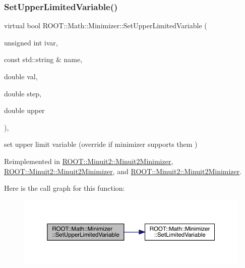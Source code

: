 \subsubsection{\texorpdfstring{SetUpperLimitedVariable()}{SetUpperLimitedVariable()}\hspace{0.1cm}{\footnotesize\ttfamily [2/3]}}
{\footnotesize\ttfamily virtual bool R\+O\+O\+T\+::\+Math\+::\+Minimizer\+::\+Set\+Upper\+Limited\+Variable (\begin{DoxyParamCaption}\item[{unsigned int}]{ivar,  }\item[{const std\+::string \&}]{name,  }\item[{double}]{val,  }\item[{double}]{step,  }\item[{double}]{upper }\end{DoxyParamCaption})\hspace{0.3cm}{\ttfamily [inline]}, {\ttfamily [virtual]}}



set upper limit variable (override if minimizer supports them ) 



Reimplemented in \mbox{\hyperlink{classROOT_1_1Minuit2_1_1Minuit2Minimizer_a70209b37c419af5d8d1475ce8de29b43}{R\+O\+O\+T\+::\+Minuit2\+::\+Minuit2\+Minimizer}}, \mbox{\hyperlink{classROOT_1_1Minuit2_1_1Minuit2Minimizer_a70209b37c419af5d8d1475ce8de29b43}{R\+O\+O\+T\+::\+Minuit2\+::\+Minuit2\+Minimizer}}, and \mbox{\hyperlink{classROOT_1_1Minuit2_1_1Minuit2Minimizer_a70209b37c419af5d8d1475ce8de29b43}{R\+O\+O\+T\+::\+Minuit2\+::\+Minuit2\+Minimizer}}.

Here is the call graph for this function\+:
\nopagebreak
\begin{figure}[H]
\begin{center}
\leavevmode
\includegraphics[width=350pt]{dc/dc4/classROOT_1_1Math_1_1Minimizer_a804843fbaea82809b3c54232d0c1fe86_cgraph}
\end{center}
\end{figure}
\mbox{\label{classROOT_1_1Math_1_1Minimizer_a804843fbaea82809b3c54232d0c1fe86}} 
